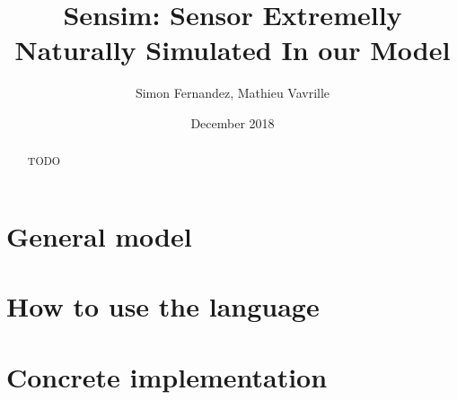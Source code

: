 \documentclass[a4paper,11pt]{article}
\title{Sensim: Sensor Extremelly Naturally Simulated In our Model}
\author{Simon Fernandez, Mathieu Vavrille}
\date{December 2018}
\begin{document}
\maketitle

\begin{abstract}
  TODO
\end{abstract}


\section{General model}





\section{How to use the language}







\section{Concrete implementation}



\end{document}
